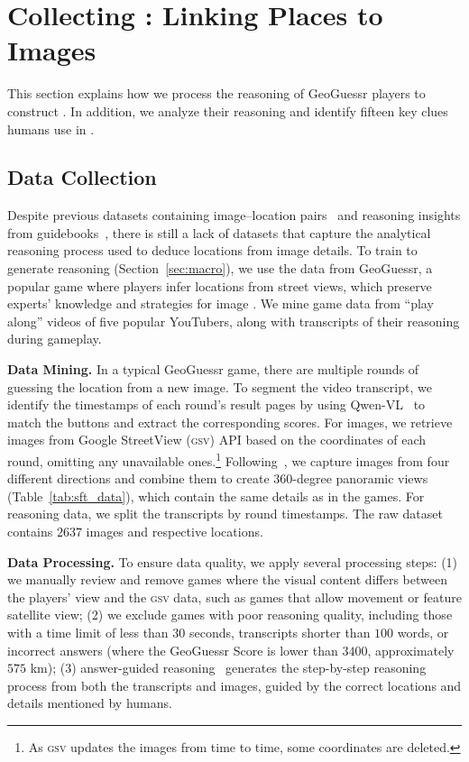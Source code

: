 \section{Collecting \dataname: Linking Places to Images}

This section explains how we process the reasoning of GeoGuessr players to construct \dataname. In addition, we analyze their reasoning and identify fifteen key clues humans use in \geoloc.

\subsection{Data Collection}
\label{sec:data_collection}

Despite previous datasets containing image--location pairs~\cite{hays2008im2gps, vo2017revisiting, astruc2024openstreetview} and reasoning insights from guidebooks~\cite{luo2022g, ligeoreasoner}, there is still a lack of datasets that capture the analytical reasoning process used to deduce locations from image details. To train \modelname to generate reasoning (Section~\ref{sec:macro}), we use the data from GeoGuessr, a popular game where players infer locations from street views, which preserve experts' knowledge and strategies for image \geoloc. We mine game data from ``play along'' videos of five popular YouTubers, along with transcripts of their reasoning during gameplay.

\textbf{Data Mining.} In a typical GeoGuessr game, there are multiple rounds of guessing the location from a new image. To segment the video transcript, we identify the timestamps of each round's result pages by using Qwen-VL~\cite{bai2023qwen} to match the buttons and extract the corresponding scores. For images, we retrieve images from Google StreetView (\textsc{gsv}) API based on the coordinates of each round, omitting any unavailable ones.\footnote{As \textsc{gsv} updates the images from time to time, some coordinates are deleted.} Following~\citet{haas2024pigeon}, we capture images from four different directions and combine them to create $360$-degree panoramic views (Table~\ref{tab:sft_data}), which contain the same details as in the games. For reasoning data, we split the transcripts by round timestamps. The raw dataset contains $2637$ images and respective locations.

\textbf{Data Processing.} To ensure data quality, we apply several processing steps: (1) we manually review and remove games where the visual content differs between the players' view and the \textsc{gsv} data, such as games that allow movement or feature satellite view; (2) we exclude games with poor reasoning quality, including those with a time limit of less than $30$ seconds, transcripts shorter than $100$ words, or incorrect answers (where the GeoGuessr Score is lower than $3400$, approximately $575$ km); (3) answer-guided reasoning~\cite{mendes2024granular} generates the step-by-step reasoning process from both the transcripts and images, guided by the correct locations and details mentioned by humans.

